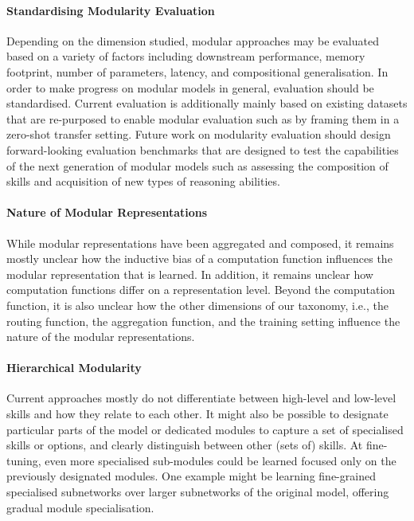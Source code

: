 \documentclass[10pt]{article} %
\begin{document}
\paragraph*{Standardising Modularity Evaluation} Depending on the dimension studied, modular approaches may be evaluated based on a variety of factors including downstream performance, memory footprint, number of parameters, latency, and compositional generalisation. In order to make progress on modular models in general, evaluation should be standardised. Current evaluation is additionally mainly based on existing datasets that are re-purposed to enable modular evaluation such as by framing them in a zero-shot transfer setting. Future work on modularity evaluation should design forward-looking evaluation benchmarks that are designed to test the capabilities of the next generation of modular models such as assessing the composition of skills and acquisition of new types of reasoning abilities.

\paragraph*{Nature of Modular Representations} While modular representations have been aggregated and composed, it remains mostly unclear how the inductive bias of a computation function influences the modular representation that is learned. In addition, it remains unclear how computation functions differ on a representation level. Beyond the computation function, it is also unclear how the other dimensions of our taxonomy, i.e., the routing function, the aggregation function, and the training setting influence the nature of the modular representations.

\paragraph*{Hierarchical Modularity} Current approaches mostly do not differentiate between high-level and low-level skills and how they relate to each other. It might also be possible to designate particular parts of the model or dedicated modules to capture a set of specialised skills or options, and clearly distinguish between other (sets of) skills. At fine-tuning, even more specialised sub-modules could be learned focused only on the previously designated modules. One example might be learning fine-grained specialised subnetworks over larger subnetworks of the original model, offering gradual module specialisation.
\end{document}
